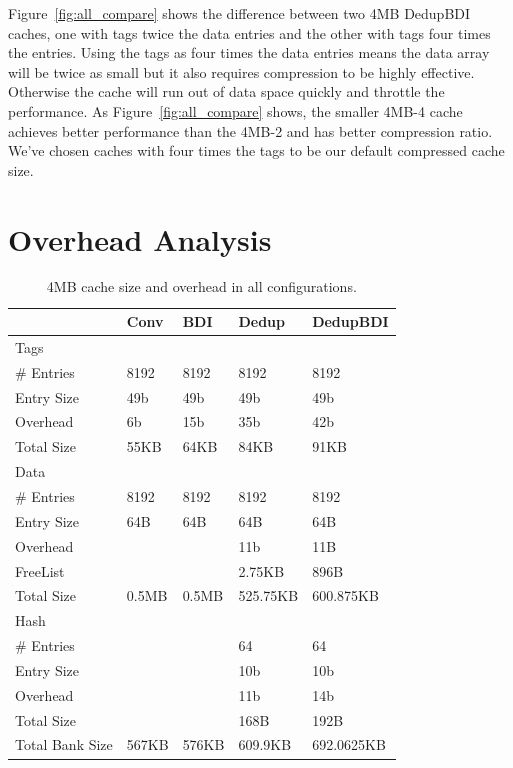 Figure~\ref{fig:all_compare} shows the difference between two 4MB DedupBDI caches, one with tags twice the data entries and the other with tags four times the entries. Using the tags as four times the data entries means the data array will be twice as small but it also requires compression to be highly effective. Otherwise the cache will run out of data space quickly and throttle the performance. As Figure~\ref{fig:all_compare} shows, the smaller 4MB-4 cache achieves better performance than the 4MB-2 and has better compression ratio. We've chosen caches with four times the tags to be our default compressed cache size.


\section{Overhead Analysis}
\label{sec:Overhead}
\begin{table}[]
    \centering
    \begin{tabular}{lllll}
               & Conv   & BDI    & Dedup  & DedupBDI \\ \hline
    Tags       &        &        &        &          \\
    \# Entries & 8192   & 8192   & 8192   & 8192     \\
    Entry Size & 49b    & 49b    & 49b    & 49b      \\
    Overhead   & 6b     & 15b    & 35b    & 42b      \\
    Total Size & 55KB   & 64KB   & 84KB   & 91KB     \\ \hline
    Data       &        &        &        &          \\
    \# Entries & 8192   & 8192   & 8192   & 8192     \\
    Entry Size & 64B    & 64B    & 64B    & 64B      \\
    Overhead   &        &        & 11b    & 11B      \\
    FreeList   &        &        & 2.75KB & 896B     \\
    Total Size & 0.5MB  & 0.5MB  & 525.75KB & 600.875KB   \\ \hline
    Hash       &        &        &        &          \\
    \# Entries &        &        & 64     & 64       \\
    Entry Size &        &        & 10b    & 10b      \\
    Overhead   &        &        & 11b    & 14b      \\
    Total Size &        &        & 168B   & 192B     \\ \hline
    Total Bank Size & 567KB & 576KB & 609.9KB & 692.0625KB  
    \end{tabular}
    \caption{4MB cache size and overhead in all configurations.}
    \label{tab:overhead}
\end{table}

